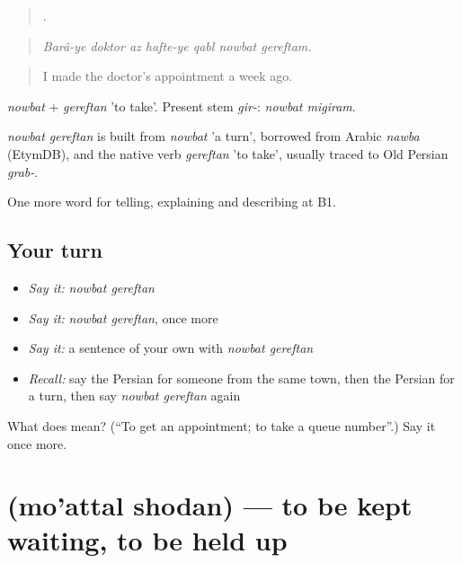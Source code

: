 \begin{quote}
      .
\end{quote}

\begin{quote}
\emph{Barâ-ye doktor az hafte-ye qabl nowbat gereftam.}
\end{quote}

\begin{quote}
I made the doctor's appointment a week ago.
\end{quote}

\emph{nowbat} + \emph{gereftan} 'to take'. Present stem \emph{gir-}: \emph{nowbat migiram}.

\begin{cousinweb}
\emph{nowbat gereftan} is built from \emph{nowbat} 'a turn', borrowed from Arabic \emph{nawba} (EtymDB), and the native verb \emph{gereftan} 'to take', usually traced to Old Persian \emph{grab-}.
\end{cousinweb}

\begin{grammarlens}[title={What you've built}]
One more word for telling, explaining and describing at B1.
\end{grammarlens}

\subsection*{Your turn}
\begin{itemize}
\raggedright
  \item \emph{Say it:} \emph{nowbat gereftan}
  \item \emph{Say it:} \emph{nowbat gereftan}, once more
  \item \emph{Say it:} a sentence of your own with \emph{nowbat gereftan}
  \item \emph{Recall:} say the Persian for someone from the same town, then the Persian for a turn, then say \emph{nowbat gereftan} again
\end{itemize}

\begin{tcolorbox}[breakable,colback=teal!4,colframe=teal!35!black,title={Before you move on}]
What does   mean? (\textquotedblleft{}To get an appointment; to take a queue number\textquotedblright{}.) Say it once more.
\end{tcolorbox}
\section[\texorpdfstring{\fa{معطل} \fa{شدن} (mo'attal shodan)}{معطل شدن (mo'attal shodan)}]{  (mo'attal shodan) — to be kept waiting, to be held up}

